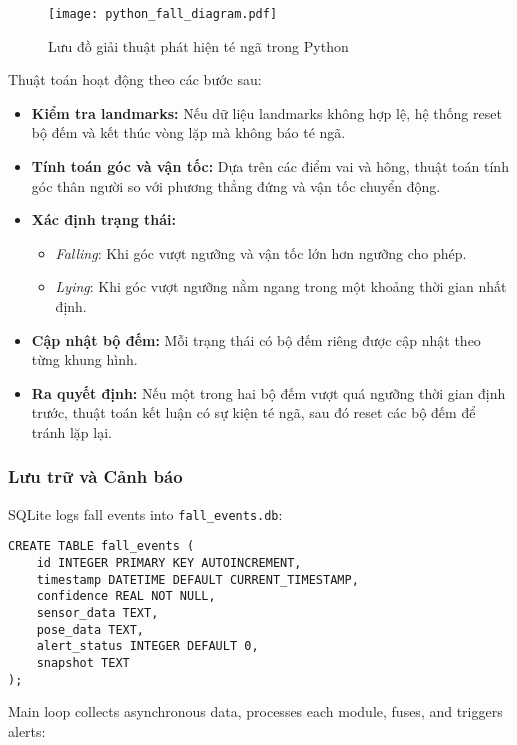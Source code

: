 \begin{figure}[H]
    \centering
    \texttt{[image: python\_fall\_diagram.pdf]}
    \caption{Lưu đồ giải thuật phát hiện té ngã trong Python}
    \label{fig:python_fall_diagram}
\end{figure}

Thuật toán hoạt động theo các bước sau:
\begin{itemize}
    \item \textbf{Kiểm tra landmarks:} Nếu dữ liệu landmarks không hợp lệ, hệ thống reset bộ đếm và kết thúc vòng lặp mà không báo té ngã.
    \item \textbf{Tính toán góc và vận tốc:} Dựa trên các điểm vai và hông, thuật toán tính góc thân người so với phương thẳng đứng và vận tốc chuyển động.
    \item \textbf{Xác định trạng thái:} 
    \begin{itemize}
        \item \textit{Falling}: Khi góc vượt ngưỡng và vận tốc lớn hơn ngưỡng cho phép.
        \item \textit{Lying}: Khi góc vượt ngưỡng nằm ngang trong một khoảng thời gian nhất định.
    \end{itemize}
    \item \textbf{Cập nhật bộ đếm:} Mỗi trạng thái có bộ đếm riêng được cập nhật theo từng khung hình.
    \item \textbf{Ra quyết định:} Nếu một trong hai bộ đếm vượt quá ngưỡng thời gian định trước, thuật toán kết luận có sự kiện té ngã, sau đó reset các bộ đếm để tránh lặp lại.
\end{itemize}

\subsubsection{Lưu trữ và Cảnh báo}
\label{subsubsec:data_storage_alerts}

SQLite logs fall events into \texttt{fall\_events.db}:

\begin{verbatim}
CREATE TABLE fall_events (
    id INTEGER PRIMARY KEY AUTOINCREMENT,
    timestamp DATETIME DEFAULT CURRENT_TIMESTAMP,
    confidence REAL NOT NULL,
    sensor_data TEXT,
    pose_data TEXT,
    alert_status INTEGER DEFAULT 0,
    snapshot TEXT
);
\end{verbatim}

Main loop collects asynchronous data, processes each module, fuses, and triggers alerts:

